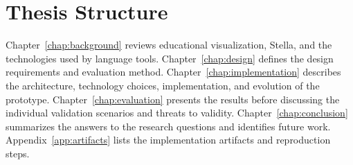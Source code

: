 \section{Thesis Structure}

Chapter~\ref{chap:background} reviews educational visualization, Stella, and the technologies used by language tools. Chapter~\ref{chap:design} defines the design requirements and evaluation method. Chapter~\ref{chap:implementation} describes the architecture, technology choices, implementation, and evolution of the prototype. Chapter~\ref{chap:evaluation} presents the results before discussing the individual validation scenarios and threats to validity. Chapter~\ref{chap:conclusion} summarizes the answers to the research questions and identifies future work. Appendix~\ref{app:artifacts} lists the implementation artifacts and reproduction steps.



